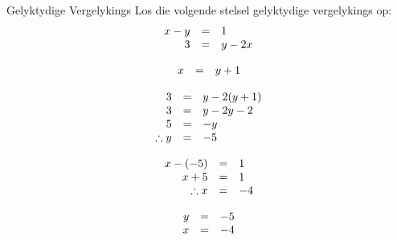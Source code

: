 \begin{wex}
{Gelyktydige Vergelykings}
{
Los die volgende stelsel gelyktydige vergelykings op:
\begin{equation*}
\begin{array}{ccl}\hfill x-y& =& 1\hfill \\ \hfill 3& =& y-2x\hfill \end{array}
\end{equation*}
}
{
\begin{equation*}
    \begin{array}{ccl}\hfill x& =& y+1\hfill 
    \end{array}
\end{equation*}

\begin{equation*}
    \begin{array}{ccl}\hfill 3& =& y-2(y+1)\hfill \\
	\hfill 3& =& y - 2y - 2\hfill \\
	\hfill 5& =& -y\hfill \\
\hfill \therefore y& =& -5\hfill
    \end{array}
\end{equation*}

\begin{equation*}
    \begin{array}{ccl}\hfill x - (-5)& =& 1\hfill \\
	\hfill x+ 5& =& 1\hfill \\
\hfill \therefore x& =& -4\hfill
    \end{array}
\end{equation*}


\begin{equation*}
\begin{array}{ccl}\hfill y& =& -5\hfill \\
 \hfill x& =& -4\hfill 
\end{array}
\end{equation*}
}
\end{wex}

